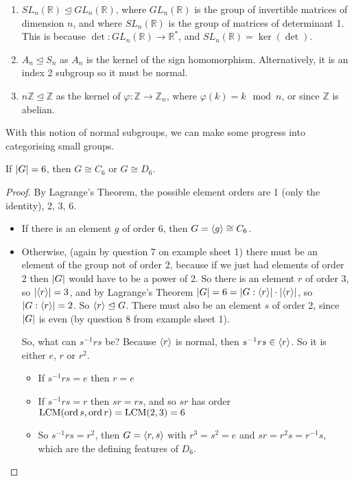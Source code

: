 \begin{enumerate}
	\item \(SL_n(\mathbb R) \trianglelefteq GL_n(\mathbb R)\), where \(GL_n(\mathbb R)\) is the group of invertible matrices of dimension \(n\), and where \(SL_n(\mathbb R)\) is the group of matrices of determinant 1.
	      This is because \(\det: GL_n(\mathbb R) \to \mathbb R^*\), and \(SL_n(\mathbb R) = \ker (\det)\).
	\item \(A_n \trianglelefteq S_n\) as \(A_n\) is the kernel of the sign homomorphism.
	      Alternatively, it is an index 2 subgroup so it must be normal.
	\item \(n\mathbb Z \trianglelefteq \mathbb Z\) as the kernel of \(\varphi: \mathbb Z \to \mathbb Z_n\), where \(\varphi(k) = k \mod n\), or since \(\mathbb Z\) is abelian.
\end{enumerate}
With this notion of normal subgroups, we can make some progress into categorising small groups.
\begin{proposition}
	If \(\abs{G} = 6\), then \(G \cong C_6\) or \(G \cong D_6\).
\end{proposition}
\begin{proof}
	By Lagrange's Theorem, the possible element orders are 1 (only the identity), 2, 3, 6.
	\begin{itemize}
		\item If there is an element \(g\) of order 6, then \(G = \langle{} g \rangle \cong C_6\).
		\item Otherwise, (again by question 7 on example sheet 1) there must be an element of the group not of order 2, because if we just had elements of order 2 then \(\abs{G}\)
		      would have to be a power of 2.
		      So there is an element \(r\) of order 3, so \(\abs{\langle{} r \rangle} = 3\), and by Lagrange's Theorem \(\abs{G} = 6 = \abs{G:\langle{} r \rangle} \cdot \abs{\langle{} r \rangle}\), so \(\abs{G:\langle{} r \rangle} = 2\).
		      So \(\langle{} r \rangle \trianglelefteq G\).
		      There must also be an element \(s\) of order 2, since \(\abs{G}\) is even (by question 8 from example sheet 1).

		      So, what can \(s^{-1} r s\) be?
		      Because \(\langle{} r \rangle\) is normal, then \(s^{-1} r s \in \langle{} r \rangle\).
		      So it is either \(e\), \(r\) or \(r^2\).
		      \begin{itemize}
			      \item If \(s^{-1}rs = e\) then \(r = e\) \contradiction{}
			      \item If \(s^{-1}rs = r\) then \(sr=rs\), and so \(sr\) has order \(\operatorname{LCM}(\operatorname{ord} s, \operatorname{ord} r) = \operatorname{LCM}(2, 3) = 6\) \contradiction{}
			      \item So \(s^{-1}rs = r^2\), then \(G = \langle{} r, s \rangle\) with \(r^3 = s^2 = e\) and \(sr = r^2 s = r^{-1}s\), which are the defining features of \(D_6\).
		      \end{itemize}
	\end{itemize}
\end{proof}

